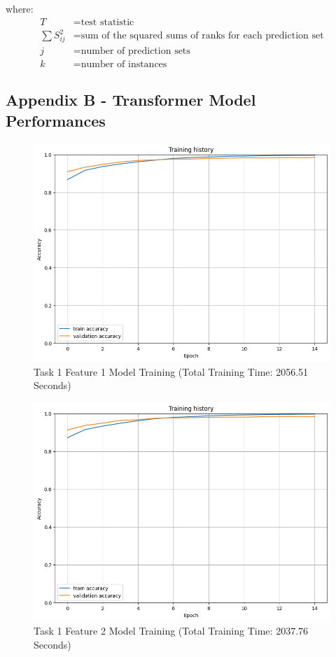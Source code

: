 \documentclass[10.7pt, onecolumn]{article}
\begin{document}
where:
\begin{align*}
T & = \text{test statistic} \\
\sum S_{ij}^2 & = \text{sum of the squared sums of ranks for each prediction set} \\
j & = \text{number of prediction sets} \\
k & = \text{number of instances}
\end{align*}
\newpage
\subsection{Appendix B - Transformer Model Performances}

\begin{figure}[H]
  \centering
  \includegraphics[]{images/model2_task1_feature1_plot.png}
  \caption{Task 1 Feature 1 Model Training (Total Training Time: 2056.51 Seconds)}
  \label{fig:t1f1plot}
\end{figure}

\begin{figure}[H]
  \centering
  \includegraphics[]{images/model2_task1_feature2_plot.png}
  \caption{Task 1 Feature 2 Model Training (Total Training Time: 2037.76 Seconds)}
  \label{fig:t1f2plot}
\end{figure}
\end{document}
